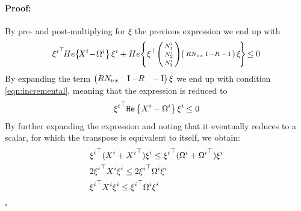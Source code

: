 \documentclass{ifacconf}
\theoremstyle{plain}
\newenvironment{proof}{\paragraph*{Proof:}}{\hfill$\square$}
\begin{document}
\begin{proof} By pre- and post-multiplying for $\xi$ the previous expression we end up with
$$
    {\xi^i}\tr\! He \!\left\{\!X^i \!-\! \Omega^i\right\} \xi^i + He\!\left\{ \xi\tr\! \smallpmat{N^i_1\\ N^i_2\\ N^i_3}\! \smallpmat{R N_{\nu x} & \Id - R & -\Id} \xi\! \right\}\! \leq 0
$$
By expanding the term $\left(\begin{matrix}R N_{\nu x} & \operatorname{I} - R & -\operatorname{I}\end{matrix}\right) \xi$ we end up with condition \eqref{eqn:incremental}, meaning that the expression is reduced to
$$
    {\xi^i}^\top \texttt{\relax{He}}\left\{{X^i - \Omega^i}\right\} \xi^i \leq 0
$$
By further expanding the expression and noting that it eventually reduces to a scalar, for which the transpose is equivalent to itself, we obtain:
\begin{equation*}
\begin{aligned}
    &{\xi^i}^\top (X^i + {X^i}^\top) \xi^i \leq {\xi^i}^\top (\Omega^i + {\Omega^i}^\top) \xi^i\\
    &2 {\xi^i}^\top X^i\xi^i \leq 2 {\xi^i}^\top \Omega^i \xi^i\\
    & {\xi^i}^\top X^i \xi^i \leq {\xi^i}^\top \Omega^i \xi^i
\end{aligned}
\end{equation*}
\end{proof}
\end{document}
